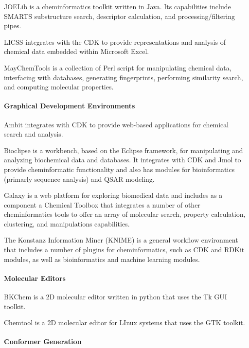 JOELib is a cheminformatics toolkit written in Java. Its capabilities include SMARTS substructure search, descriptor calculation, and processing/filtering pipes.

LICSS \cite{Lawson_2012} integrates with the CDK to provide representations and analysis of chemical data embedded within Microsoft Excel.

MayChemTools is a collection of Perl script for manipulating chemical data, interfacing with databases, generating fingerprints, performing similarity search, and computing molecular properties.


\paragraph{Graphical Development Environments}

Ambit \cite{Jeliazkova_2011} integrates with CDK to provide web-based applications for chemical search and analysis.

Bioclipse  \cite{Spjuth_2009} is a workbench, based on the Eclipse framework, for manipulating and analyzing biochemical data and databases. It integrates with CDK and Jmol to provide cheminformatic functionality and also has modules for bioinformatics (primarly sequence analysis) and QSAR modeling.

Galaxy \cite{Goecks_2010} is a web platform for exploring biomedical data and includes as a component a Chemical Toolbox that integrates a number of other cheminformatics tools to offer an array of molecular search, property calculation, clustering, and manipulations capabilities.

The Konstanz Information Miner (KNIME) is a general workflow environment that includes a number of plugins for cheminformatics, such as CDK \cite{Beisken_2013} and RDKit modules, as well as bioinformatics and machine learning modules.


\paragraph{Molecular Editors}

BKChem is a 2D molecular editor written in python that uses the Tk GUI toolkit.

Chemtool is a 2D molecular editor for LInux systems that uses the GTK toolkit.

\paragraph{Conformer Generation}

